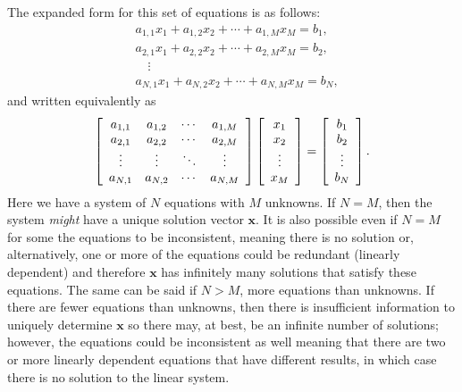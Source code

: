 The expanded form for this set of equations is as follows:
\begin{align}
  &a_{1,1} x_1 + a_{1,2} x_2 + \cdots + a_{1,M} x_M = b_1, \nonumber \\
  &a_{2,1} x_1 + a_{2,2} x_2 + \cdots + a_{2,M} x_M = b_2, \nonumber \\
  & \quad \vdots \nonumber \\
  &a_{N,1} x_1 + a_{N,2} x_2 + \cdots + a_{N,M} x_M = b_N,
\end{align}
and written equivalently as
\begin{align}
  \left[ \begin{array}{c c c c} a_{1,1} & a_{1,2} & \cdots & a_{1,M} \\
  								a_{2,1} & a_{2,2} & \cdots & a_{2,M} \\
								\vdots  & \vdots  & \ddots & \vdots  \\
								a_{N,1} & a_{N,2} & \cdots & a_{N,M} \\ \end{array} \right]
  \left[ \begin{array}{c} x_1 \\ x_2 \\ \vdots \\ x_M  \\ \end{array} \right] =
  \left[ \begin{array}{c} b_1 \\ b_2 \\ \vdots \\ b_N  \\ \end{array} \right] .
\end{align}
Here we have a system of $N$ equations with $M$ unknowns. If $N = M$, then the system \emph{might} have a unique solution vector $\mathbf{x}$. It is also possible even if $N = M$ for some the equations to be inconsistent, meaning there is no solution or, alternatively, one or more of the equations could be redundant (linearly dependent) and therefore $\mathbf{x}$ has infinitely many solutions that satisfy these equations. The same can be said if $N > M$, more equations than unknowns. If there are fewer equations than unknowns, then there is insufficient information to uniquely determine $\mathbf{x}$ so there may, at best, be an infinite number of solutions; however, the equations could be inconsistent as well meaning that there are two or more linearly dependent equations that have different results, in which case there is no solution to the linear system.

